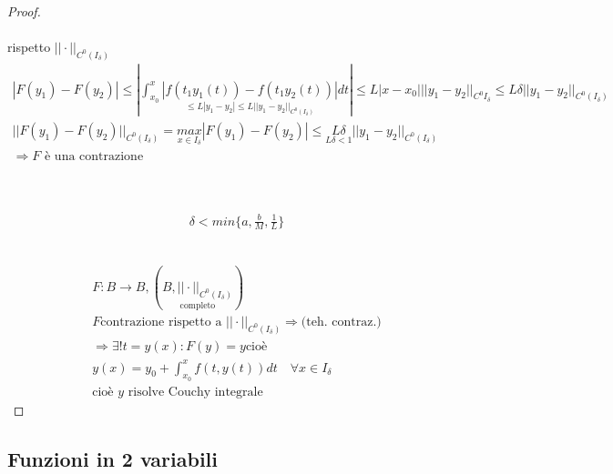 \documentclass[a4paper, oneside]{article}
\begin{document}
\begin{proof}
    \hfil\\
    \\
     rispetto $||\cdot||_{C^0 (I_\delta)}$\\
    \begin{gather*}
        |F(y_1) - F(y_2)| \leq | \int_{x_0}^{x} \underset{\leq L |y_1-y_2| \leq L ||y_1-y_2||_{C^0 (I_\delta)} }{| f(t_1 y_1(t)) -f(t_1y_2(t)) |}  dt | \leq L |x - x_0| ||y_1-y_2||_{C^0 I_\delta} \leq L\delta ||y_1-y_2||_{C^0 (I_\delta)}\\
        ||F(y_1) - F(y_2)||_{C^0 (I_\delta)} = \underset{x \in I_\delta}{max} \left|F(y_1)-F(y_2)\right| \leq \underset{L \delta < 1}{L \delta} || y_1-y_2||_{C^0 (I_\delta)}\\
        \Rightarrow F\text{ è una contrazione}
    \end{gather*}

    
    \hfil\\
    \\
    \begin{gather*}
        \delta < min \{a, \frac{b}{M}, \frac{1}{L}\}
    \end{gather*}

    \hfil\\
    \begin{gather*}
        F:B \to B , (\underset{\text{completo}}{B, || \cdot||_{C^0 (I_\delta)}})\\
        F \text{contrazione rispetto a } ||\cdot||_{C^0 (I_\delta)} \Rightarrow \text{(teh. contraz.)}\\
        \Rightarrow \exists! t = y(x):F(y) = y \text{cioè}\\
        y(x) = y_0 + \int_{x_0}^{x} f(t, y(t)) dt \quad \forall x \in I_\delta\\
        \text{cioè } y \text{ risolve Couchy integrale}
    \end{gather*}

        \end{proof}
    
        \subsection{Funzioni in 2 variabili}
\end{document}
